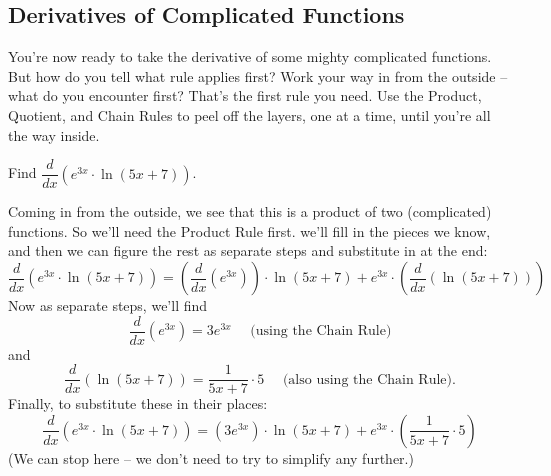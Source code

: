 \subsection{Derivatives of Complicated Functions}
You're now ready to take the derivative of some mighty complicated functions. But how do you tell what rule applies first? Work your way in from the outside -- what do you encounter first? That's the first rule you need. Use the Product, Quotient, and Chain Rules to peel off the layers, one at a time, until you're all the way inside.

\begin{example}
Find $\dfrac{d}{dx}\left( e^{3x}\cdot\ln(5x+7) \right) $.

\begin{solution} Coming in from the outside, we see that this is a product of two (complicated) functions. So we'll need the Product Rule first. we'll fill in the pieces we know, and then we can figure the rest as separate steps and substitute in at the end:
$$\dfrac{d}{dx}\left( e^{3x}\cdot\ln(5x+7) \right)=\left( \dfrac{d}{dx}\left( e^{3x}\right)\right)\cdot\ln(5x+7)+ e^{3x}\cdot \left(\dfrac{d}{dx}\left(\ln(5x+7) \right)\right)$$
Now as separate steps, we'll find
$$\dfrac{d}{dx}\left( e^{3x}\right)=3e^{3x} \quad \text{ (using the Chain Rule)}$$ 
and 
$$\dfrac{d}{dx}\left(\ln(5x+7) \right)=\dfrac{1}{5x+7}\cdot 5 \quad \text{ (also using the Chain Rule)}.$$
Finally, to substitute these in their places:
$$\dfrac{d}{dx}\left( e^{3x}\cdot\ln(5x+7) \right)=\left( 3e^{3x}\right)\cdot\ln(5x+7)+ e^{3x}\cdot \left(\dfrac{1}{5x+7}\cdot 5\right)$$
(We can stop here -- we don't need to try to simplify any further.)
\end{solution}\end{example}

